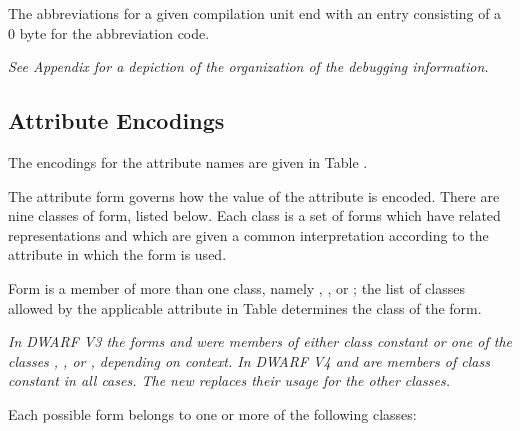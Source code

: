 The abbreviations for a given compilation unit end with an
entry consisting of a 0 byte for the abbreviation code.

\textit{See 
Appendix  
for a depiction of the organization of the
debugging information.}

\subsection{Attribute Encodings}
\label{datarep:attributeencodings}

The encodings for the attribute names are given in 
Table .

The attribute form governs how the value of the attribute is
encoded. There are nine classes of form, listed below. Each
class is a set of forms which have related representations
and which are given a common interpretation according to the
attribute in which the form is used.

Form  
is a member of more 
than 
one 
class,
namely , 
, 
 or 
; the list
of classes allowed by the applicable attribute in 
Table 
determines the class of the form.

\textit{In DWARF V3 the forms  and  were
members 
of 
either 
class constant 
or one of the classes 
,
, 
 or 
, depending on context. In
DWARF V4 
 and 
 are members of class
constant in all cases. 
The new 
 replaces
their usage for the other classes.}

Each possible form belongs to one or more of the following classes:


